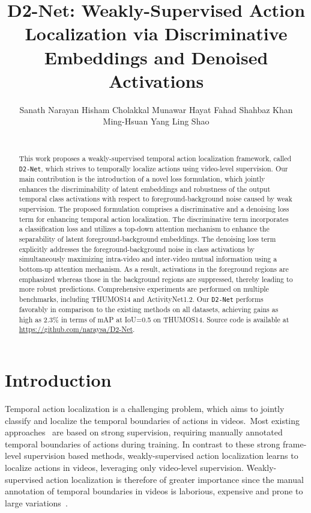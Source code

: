 \documentclass[10pt,twocolumn,letterpaper]{article}
\title{D2-Net: Weakly-Supervised Action Localization via Discriminative Embeddings and Denoised Activations}
\author{
Sanath Narayan\affmark[1] \quad
Hisham Cholakkal\affmark[2] \quad 
Munawar Hayat\affmark[3] \quad
Fahad Shahbaz Khan\affmark[2,4] \\
Ming-Hsuan Yang\affmark[5,6,7] \quad
Ling Shao\affmark[1] \vspace{0.01cm}\\
\affaddr{\affmark[1]Inception Institute of Artificial Intelligence} \hspace{0.1cm}
\affaddr{\affmark[2]Mohamed Bin Zayed University of AI} \hspace{0.1cm}
\affaddr{\affmark[3]Monash University} \\
\affaddr{\affmark[4]Linköping University} \hspace{0.1cm}
\affaddr{\affmark[5]University of California, Merced} \hspace{0.1cm}
\affaddr{\affmark[6]Google Research} \hspace{0.1cm}
\affaddr{\affmark[7]Yonsei University}
}
\def\proposed{\texttt{D2-Net}{}}
\begin{document}
\maketitle
\begin{abstract}

   This work proposes a weakly-supervised temporal action localization framework, called \proposed, which strives to temporally localize actions using video-level supervision. 
Our main contribution is the introduction of a novel loss formulation, which jointly enhances the discriminability of latent embeddings and robustness of the output temporal class activations with respect to foreground-background noise caused by weak supervision. 
The proposed formulation comprises a discriminative and a denoising loss term for enhancing temporal action localization. 
The discriminative term incorporates a classification loss and utilizes a top-down attention mechanism to enhance the separability of latent foreground-background embeddings. 
The denoising loss term explicitly addresses the foreground-background noise in class activations by simultaneously maximizing intra-video and inter-video mutual information using a bottom-up attention mechanism. As a result, activations in the foreground regions are emphasized whereas those in the background regions are suppressed, thereby leading to more robust predictions.
Comprehensive experiments are performed on multiple benchmarks, including THUMOS14 and ActivityNet1.2.
Our \proposed{} performs favorably in comparison to the existing methods on all datasets, achieving gains as high as 2.3\% in terms of mAP at IoU=0.5 on THUMOS14.
Source code is available at \url{https://github.com/naraysa/D2-Net}.


\end{abstract}




\section{Introduction\label{sec:introduction}}

Temporal action localization is a challenging problem, which aims to jointly classify and localize the temporal boundaries of actions in videos.~Most existing approaches~\cite{gtad,talnet,rc3d,cdc,ssn,scnn} are based on strong supervision, requiring manually annotated temporal boundaries of actions during training.
In contrast to these strong frame-level supervision based methods, weakly-supervised action localization learns to localize actions in videos, leveraging only video-level supervision.
Weakly-supervised action localization is therefore of greater importance since the manual annotation of temporal boundaries in videos is laborious, expensive and prone to large variations~\cite{action-snippet,action-extent}. 
\end{document}
